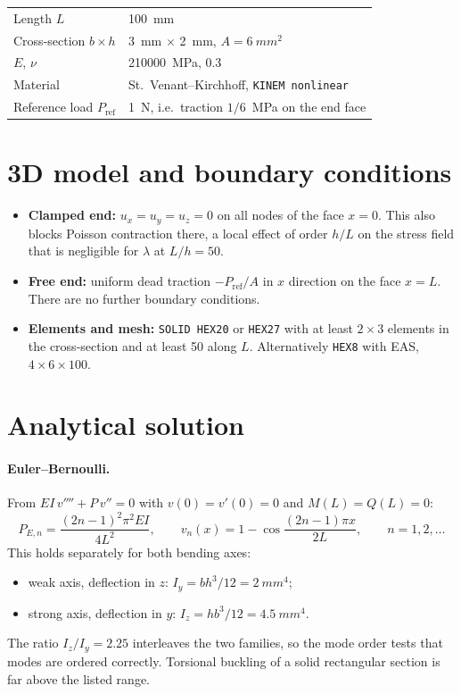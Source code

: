 \documentclass[11pt,a4paper]{report}
\begin{document}
\begin{center}
\begin{tabular}{@{}ll@{}}
\toprule
Length $L$ & \SI{100}{mm} \\
Cross-section $b\times h$ & \SI{3}{mm} $\times$ \SI{2}{mm}, $A=\SI{6}{mm^2}$ \\
$E$, $\nu$ & \SI{210000}{MPa}, 0.3 \\
Material & St.\ Venant--Kirchhoff, \texttt{KINEM nonlinear} \\
Reference load $P_\text{ref}$ & \SI{1}{N}, i.e.\ traction $1/6$~\si{MPa} on the end face \\
\bottomrule
\end{tabular}
\end{center}

\section{3D model and boundary conditions}
\begin{itemize}
\item \textbf{Clamped end:} $u_x=u_y=u_z=0$ on all nodes of the face $x=0$.
  This also blocks Poisson contraction there, a local effect of order
  $h/L$ on the stress field that is negligible for $\lambda$ at $L/h=50$.
\item \textbf{Free end:} uniform dead traction $-P_\text{ref}/A$ in $x$
  direction on the face $x=L$. There are no further boundary conditions.
\item \textbf{Elements and mesh:} \texttt{SOLID HEX20} or \texttt{HEX27} with
  at least $2\times3$ elements in the cross-section and at least 50 along
  $L$. Alternatively \texttt{HEX8} with EAS, $4\times6\times100$.
\end{itemize}

\section{Analytical solution}

\paragraph{Euler--Bernoulli.}
From $EI\,v'''' + P\,v'' = 0$ with $v(0)=v'(0)=0$ and $M(L)=Q(L)=0$:
\begin{equation}
  P_{E,n} = \frac{(2n-1)^2\pi^2 EI}{4L^2},\qquad
  v_n(x) = 1-\cos\frac{(2n-1)\pi x}{2L},\qquad n=1,2,\dots
\end{equation}
This holds separately for both bending axes:
\begin{itemize}
\item weak axis, deflection in $z$: $I_y = b h^3/12 = \SI{2}{mm^4}$;
\item strong axis, deflection in $y$: $I_z = h b^3/12 = \SI{4.5}{mm^4}$.
\end{itemize}
The ratio $I_z/I_y = 2.25$ interleaves the two families, so the mode order
tests that modes are ordered correctly.
Torsional buckling of a solid rectangular section is far above the listed
range.
\end{document}
